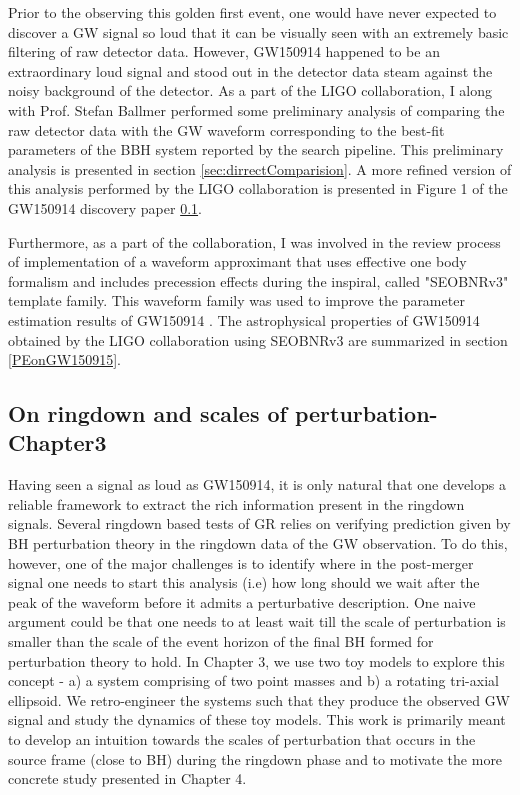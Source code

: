 Prior to the observing this golden first event, one would have never expected to discover a GW signal so loud that it can be visually seen with an extremely basic filtering of raw detector data. However, GW150914  happened to be an extraordinary loud signal and stood out in the detector data steam against the noisy background of the detector. As a part of the LIGO collaboration, I along with Prof. Stefan Ballmer performed some preliminary analysis of comparing the raw detector data with the GW waveform corresponding to the best-fit parameters of the BBH system reported by the search pipeline. This preliminary analysis is presented in section \ref{sec:dirrectComparision}. A more refined version of this analysis performed by the LIGO collaboration is presented in Figure 1 of the GW150914 discovery paper \ref{}.  

Furthermore, as a part of the collaboration, I was involved in the review process of implementation of a waveform approximant that uses effective one body formalism and includes precession effects during the inspiral, called "SEOBNRv3" template family. This waveform family was used to improve the parameter estimation results of GW150914 \cite{}. The astrophysical properties of GW150914 obtained by the LIGO collaboration using SEOBNRv3 are summarized in section \ref{PEonGW150915}.   

\subsection{On ringdown and scales of perturbation- Chapter3}
Having seen a signal as loud as GW150914, it is only natural that one develops a reliable framework to extract the rich information present in the ringdown signals. Several ringdown based tests of GR relies on verifying prediction given by BH perturbation theory in the ringdown data of the GW observation. To do this, however, one of the major challenges is to identify where in the post-merger signal one needs to start this analysis (i.e) how long should we wait after the peak of the waveform before it admits a perturbative description. One naive argument could be that one needs to at least wait till the scale of perturbation is smaller than the scale of the event horizon of the final BH formed for perturbation theory to hold. In Chapter 3, we use two toy models to explore this concept - a) a system comprising of two point masses and b) a rotating tri-axial ellipsoid. We retro-engineer the systems such that they produce the observed GW signal and study the dynamics of these toy models. This work is primarily meant to develop an intuition towards the scales of perturbation that occurs in the source frame (close to BH) during the ringdown phase and to motivate the more concrete study presented in Chapter 4. 


